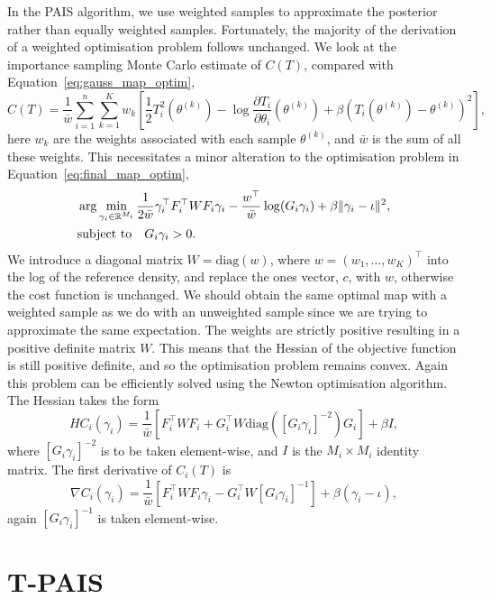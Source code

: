 \documentclass[final]{siamltex}
\begin{document}
In the PAIS algorithm, we use weighted samples to approximate the posterior rather than equally weighted samples. Fortunately, the majority of the derivation of a weighted optimisation problem
follows unchanged. We look at the importance sampling Monte Carlo estimate of $C(T)$, compared with
Equation~\eqref{eq:gauss_map_optim},
\[
	C(T) = \frac{1}{\bar{w}}\sum\limits_{i=1}^n \! \sum\limits_{k=1}^K
		w_k\left[\frac{1}{2}T_i^2(\theta^{(k)}) - \log\frac{\partial
		T_i}{\partial\theta_i}(\theta^{(k)}) + \beta(T_i(\theta^{(k)})-\theta^{(k)})^2\right],
\]
here $w_k$ are the weights associated with each sample $\theta^{(k)}$, and $\bar{w}$ is the sum of
all these weights. This necessitates a minor alteration to the optimisation problem in
Equation~\eqref{eq:final_map_optim},
\begin{align}\label{eq:weighted_map_optim}
	&\arg\min_{\gamma_i\in\mathbb{R}^{M_i}} \frac{1}{2\bar{w}}\gamma_i^\top F_i^\top WF_i\gamma_i -
		\frac{w^\top}{\bar{w}}\log(G_i\gamma_i) + \beta\|\gamma_i-\iota\|^2, \\
	&\text{subject to} \quad G_i\gamma_i > 0. \notag
\end{align}
We introduce a diagonal matrix $W = \text{diag}(w)$, where $w = (w_1,\dots,w_K)^\top$ into the log of the reference density, and replace the ones vector, $c$, with $w$, otherwise the cost function is unchanged. We should obtain the same optimal map with a weighted sample as we do with an unweighted sample since we are trying to approximate the same expectation. The weights are strictly
positive resulting in a positive definite matrix $W$. This means that the Hessian of the objective
function is still positive definite, and so the optimisation problem remains convex. Again this
problem can be efficiently solved using the Newton optimisation algorithm. The Hessian takes the
form
\[
	HC_i(\gamma_i) = \frac{1}{\bar{w}}\left[F_i^\top WF_i + G_i^\top
		W\text{diag}([G_i\gamma_i]^{-2})G_i\right] + \beta I,
\]
where $[G_i\gamma_i]^{-2}$ is to be taken element-wise, and $I$ is the $M_i\times M_i$
identity matrix. The first derivative of $C_i(T)$ is
\[
	\nabla C_i(\gamma_i) = \frac{1}{\bar{w}}\left[F_i^\top WF_i\gamma_i - G_i^\top
		W[G_i\gamma_i]^{-1}\right] + \beta(\gamma_i - \iota),
\]
again $[G_i\gamma_i]^{-1}$ is taken element-wise.

\section{T-PAIS}\label{sec:TPAIS}
\end{document}
